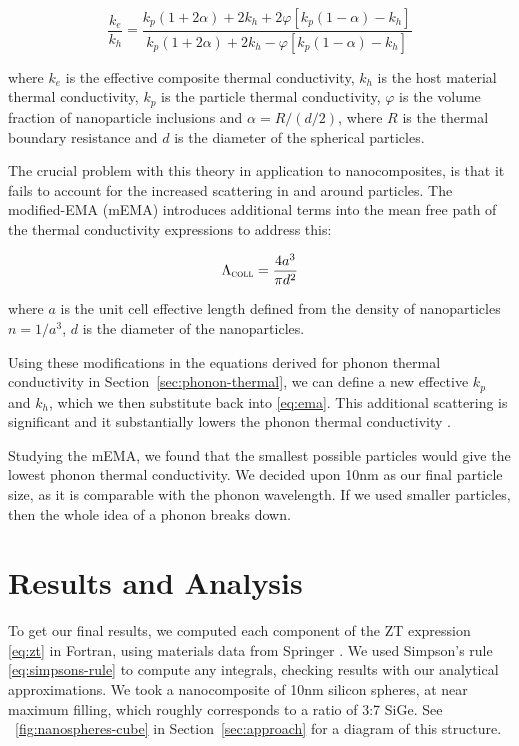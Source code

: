 \documentclass[12pt]{article}
\newcommand{\figref}[2][\figurename~]{#1\ref{#2}}
\newcommand{\secref}[2][Section~]{#1\ref{#2}}
\begin{document}
\begin{equation}
\label{eq:ema}
	\frac{k_e}{k_h} = \frac{k_p (1 + 2\alpha) + 2k_h + 2	\varphi [k_p (1 - \alpha) - k_h]}{k_p (1 + 2\alpha) + 2k_h -	\varphi [k_p (1 - \alpha) - k_h]}
\end{equation}

where $k_e$ is the effective composite thermal conductivity, $k_h$ is the host material thermal conductivity, $k_p$ is the particle thermal conductivity, $\varphi$  is the volume fraction of nanoparticle inclusions and $\alpha = R / (d / 2)$, where $R$ is the thermal boundary resistance and $d$ is the diameter of the spherical particles.

The crucial problem with this theory in application to nanocomposites, is that it fails to account for the increased scattering in and around particles. The modified-EMA (mEMA) \cite{mema} introduces additional terms into the mean free path of the thermal conductivity expressions to address this:

\begin{equation}
\label{eq:mema}
	\Lambda_{\textsc{coll}} = \frac {4a^3}{\pi d^2}
\end{equation}

where $a$ is the unit cell effective length defined from the density of nanoparticles $n = 1 / a^3$, $d$ is the diameter of the nanoparticles.

Using these modifications in the equations derived for phonon thermal conductivity in \secref{sec:phonon-thermal}, we can define a new effective $k_p$ and $k_h$, which we then substitute back into \eqref{eq:ema}. This additional scattering is significant and it substantially lowers the phonon thermal conductivity \cite{mema}.

Studying the mEMA, we found that the smallest possible particles would give the lowest phonon thermal conductivity. We decided upon 10nm as our final particle size, as it is comparable with the phonon wavelength. If we used smaller particles, then the whole idea of a phonon breaks down.

\section{Results and Analysis}
To get our final results, we computed each component of the ZT expression \eqref{eq:zt} in Fortran, using materials data from Springer \cite{springer}. We used Simpson's rule \eqref{eq:simpsons-rule} to compute any integrals, checking results with our analytical approximations. We took a nanocomposite of 10nm silicon spheres, at near maximum filling, which roughly corresponds to a ratio of 3:7 SiGe. See \figref{fig:nanospheres-cube} in \secref{sec:approach} for a diagram of this structure.
\end{document}
